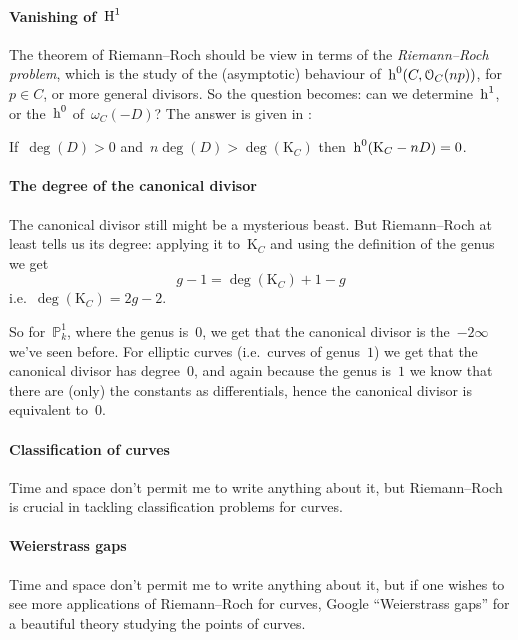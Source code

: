 \documentclass[10pt,a4paper]{article}
\begin{document}
\paragraph{Vanishing of~$\operatorname{H}^1$}
The theorem of Riemann--Roch should be view in terms of the \emph{Riemann--Roch problem}, which is the study of the (asymptotic) behaviour of~$\operatorname{h}^0(C,\mathcal{O}_C(np))$, for~$p\in C$, or more general divisors. So the question becomes: can we determine~$\operatorname{h}^1$, or the~$\operatorname{h}^0$ of~$\omega_C(-D)$? The answer is given in \cite[remark IV.1.3.2]{hartshorne-algebraic-geometry}:
\begin{lemma}
  If~$\deg(D)>0$ and~$n\deg(D)>\deg(\mathrm{K}_C)$ then~$\operatorname{h}^0(\mathrm{K}_C-nD)=0$.
\end{lemma}

\paragraph{The degree of the canonical divisor}
The canonical divisor still might be a mysterious beast. But Riemann--Roch at least tells us its degree: applying it to~$\mathrm{K}_C$ and using the definition of the genus we get
\begin{equation}
  g-1=\deg(\mathrm{K}_C)+1-g
\end{equation}
i.e.\ $\deg(\mathrm{K}_C)=2g-2$.

So for~$\mathbb{P}_k^1$, where the genus is~$0$, we get that the canonical divisor is the~$-2\infty$ we've seen before. For elliptic curves (i.e.\ curves of genus~$1$) we get that the canonical divisor has degree~$0$, and again because the genus is~$1$ we know that there are (only) the constants as differentials, hence the canonical divisor is equivalent to~$0$.

\paragraph{Classification of curves}
Time and space don't permit me to write anything about it, but Riemann--Roch is crucial in tackling classification problems for curves.

\paragraph{Weierstrass gaps}
Time and space don't permit me to write anything about it, but if one wishes to see more applications of Riemann--Roch for curves, Google ``Weierstrass gaps'' for a beautiful theory studying the points of curves.
\end{document}
